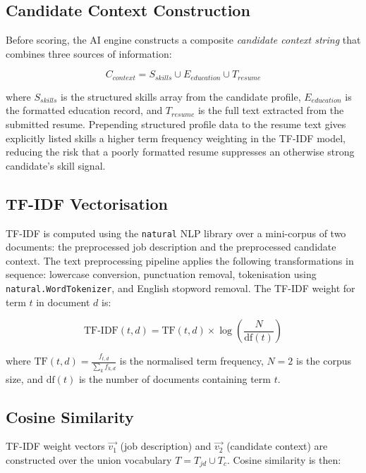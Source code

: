 \documentclass[12pt,a4paper]{report}
\begin{document}
\subsection{Candidate Context Construction}

Before scoring, the AI engine constructs a composite \textit{candidate context string} that combines three sources of information:

\begin{equation}
    C_{context} = S_{skills} \cup E_{education} \cup T_{resume}
\end{equation}

where $S_{skills}$ is the structured skills array from the candidate profile, $E_{education}$ is the formatted education record, and $T_{resume}$ is the full text extracted from the submitted resume. Prepending structured profile data to the resume text gives explicitly listed skills a higher term frequency weighting in the TF-IDF model, reducing the risk that a poorly formatted resume suppresses an otherwise strong candidate's skill signal.

\subsection{TF-IDF Vectorisation}

TF-IDF is computed using the \texttt{natural} NLP library over a mini-corpus of two documents: the preprocessed job description and the preprocessed candidate context. The text preprocessing pipeline applies the following transformations in sequence: lowercase conversion, punctuation removal, tokenisation using \texttt{natural.WordTokenizer}, and English stopword removal. The TF-IDF weight for term $t$ in document $d$ is:

\begin{equation}
    \text{TF-IDF}(t,d) = \text{TF}(t,d) \times \log\!\left(\frac{N}{\text{df}(t)}\right)
\end{equation}

where $\text{TF}(t,d) = \frac{f_{t,d}}{\sum_k f_{k,d}}$ is the normalised term frequency, $N = 2$ is the corpus size, and $\text{df}(t)$ is the number of documents containing term $t$.

\subsection{Cosine Similarity}

TF-IDF weight vectors $\vec{v_1}$ (job description) and $\vec{v_2}$ (candidate context) are constructed over the union vocabulary $T = T_{jd} \cup T_c$. Cosine similarity is then:
\end{document}
